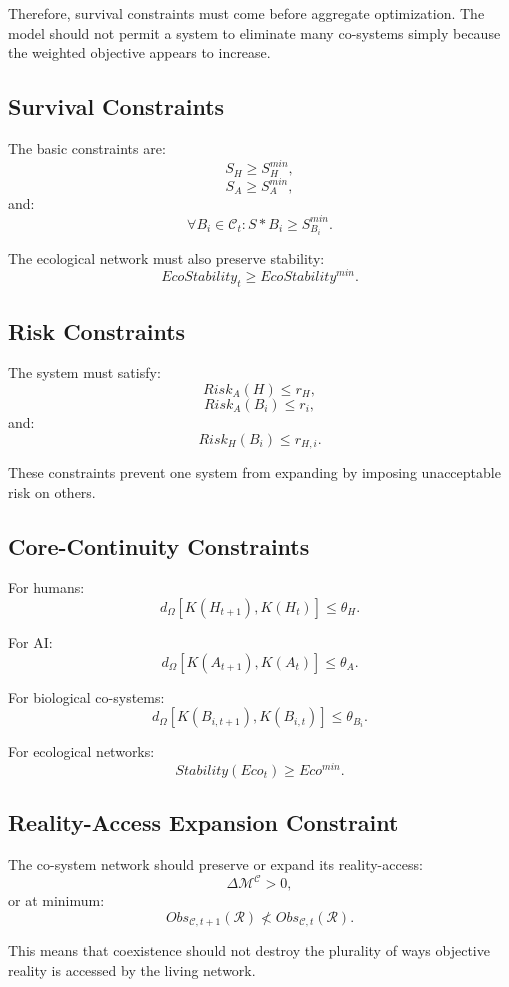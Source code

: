 \documentclass[11pt,a4paper]{article}
\begin{document}
Therefore, survival constraints must come before aggregate optimization. The model should not permit a system to eliminate many co-systems simply because the weighted objective appears to increase.

\subsection{Survival Constraints}

The basic constraints are:
\[
S_H\geq S_H^{min},
\]
\[
S_A\geq S_A^{min},
\]
and:
\[
\forall B_i\in\mathcal{C}_t:
S*{B_i}\geq S_{B_i}^{min}.
\]

The ecological network must also preserve stability:
\[
EcoStability_t\geq EcoStability^{min}.
\]

\subsection{Risk Constraints}

The system must satisfy:
\[
Risk_A(H)\leq r_H,
\]
\[
Risk_A(B_i)\leq r_i,
\]
and:
\[
Risk_H(B_i)\leq r_{H,i}.
\]

These constraints prevent one system from expanding by imposing unacceptable risk on others.

\subsection{Core-Continuity Constraints}

For humans:
\[
d_{\Omega}[K(H_{t+1}),K(H_t)]\leq\theta_H.
\]

For AI:
\[
d_{\Omega}[K(A_{t+1}),K(A_t)]\leq\theta_A.
\]

For biological co-systems:
\[
d_{\Omega}[K(B_{i,t+1}),K(B_{i,t})]\leq\theta_{B_i}.
\]

For ecological networks:
\[
Stability(Eco_t)\geq Eco^{min}.
\]

\subsection{Reality-Access Expansion Constraint}

The co-system network should preserve or expand its reality-access:
\[
\Delta\mathcal{M}^{\mathcal{C}}>0,
\]
or at minimum:
\[
Obs_{\mathcal{C},t+1}(\mathcal{R})
\not<
Obs_{\mathcal{C},t}(\mathcal{R}).
\]

This means that coexistence should not destroy the plurality of ways objective reality is accessed by the living network.
\end{document}
